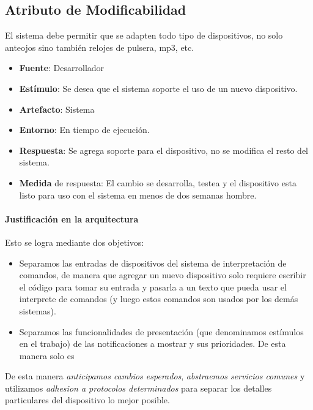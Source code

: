 \subsection{Atributo de Modificabilidad}
El sistema debe permitir que se adapten todo tipo de dispositivos, no solo anteojos sino también relojes de pulsera, mp3, etc.

\begin{itemize}
  \item \textbf{Fuente}: Desarrollador
  \item \textbf{Estímulo}: Se desea que el sistema soporte el uso de un nuevo dispositivo.
  \item \textbf{Artefacto}: Sistema
  \item \textbf{Entorno}: En tiempo de ejecución.
  \item \textbf{Respuesta}: Se agrega soporte para el dispositivo, no se modifica el resto del sistema.
  \item \textbf{Medida} de respuesta: El cambio se desarrolla, testea y el dispositivo esta listo para uso con el sistema en menos de dos semanas hombre.
\end{itemize}

\paragraph{Justificación en la arquitectura}

Esto se logra mediante dos objetivos:

\begin{itemize}
	\item 
		Separamos las entradas de dispositivos del sistema de interpretación de comandos, de manera que agregar
		un nuevo dispositivo solo requiere escribir el código para tomar su entrada y pasarla a un texto que
		pueda usar el interprete de comandos (y luego estos comandos son usados por los demás sistemas).
	\item 
		Separamos las funcionalidades de presentación (que denominamos estímulos en el trabajo) de las 
		notificaciones a mostrar y sus prioridades. De esta manera solo es 
\end{itemize}

De esta manera \textit{anticipamos cambios esperados}, \textit{abstraemos servicios comunes} y utilizamos
\textit{adhesion a protocolos determinados} para separar los detalles particulares del dispositivo lo mejor
posible.
